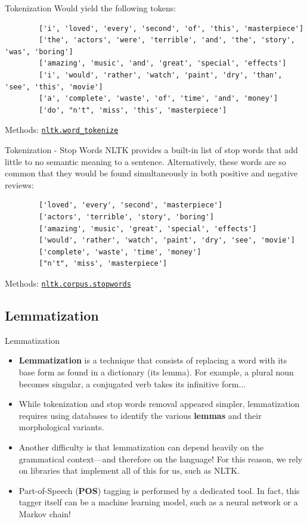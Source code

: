 \begin{frame}[fragile]{Tokenization}
	Would yield the following tokens:
	\begin{lstlisting}
		['i', 'loved', 'every', 'second', 'of', 'this', 'masterpiece']
		['the', 'actors', 'were', 'terrible', 'and', 'the', 'story', 'was', 'boring']
		['amazing', 'music', 'and', 'great', 'special', 'effects']
		['i', 'would', 'rather', 'watch', 'paint', 'dry', 'than', 'see', 'this', 'movie']
		['a', 'complete', 'waste', 'of', 'time', 'and', 'money']
		['do', "n't", 'miss', 'this', 'masterpiece']
	\end{lstlisting}
	\vfill
	Methods: \href{https://www.nltk.org/api/nltk.tokenize.html\#nltk-tokenize-package}{\texttt{nltk.word\_tokenize}}
\end{frame}

\begin{frame}[fragile]{Tokenization - Stop Words}
	NLTK provides a built-in list of stop words that add little to no semantic meaning to a sentence. Alternatively, these words are so common that they would be found simultaneously in both positive and negative reviews:
	\begin{lstlisting}
		['loved', 'every', 'second', 'masterpiece']
		['actors', 'terrible', 'story', 'boring']
		['amazing', 'music', 'great', 'special', 'effects']
		['would', 'rather', 'watch', 'paint', 'dry', 'see', 'movie']
		['complete', 'waste', 'time', 'money']
		["n't", 'miss', 'masterpiece']
	\end{lstlisting}
	\vfill
	Methods: \href{https://www.nltk.org/howto/corpus.html\#word-lists-and-lexicons}{\texttt{nltk.corpus.stopwords}}
\end{frame}

\subsection[Lemmatization]{Lemmatization}

\begin{frame}[fragile]{Lemmatization}
	\begin{itemize}
		\item \textbf{Lemmatization} is a technique that consists of replacing a word with its base form as found in a dictionary (its lemma). For example, a plural noun becomes singular, a conjugated verb takes its infinitive form...
		\pause
		\item While tokenization and stop words removal appeared simpler, lemmatization requires using databases to identify the various \textbf{lemmas} and their morphological variants.
		\pause
		\item Another difficulty is that lemmatization can depend heavily on the grammatical context—and therefore on the language! For this reason, we rely on libraries that implement all of this for us, such as NLTK.
		\pause
		\item Part-of-Speech (\textbf{POS}) tagging is performed by a dedicated tool. In fact, this tagger itself can be a machine learning model, such as a neural network or a Markov chain!
	\end{itemize}
\end{frame}

